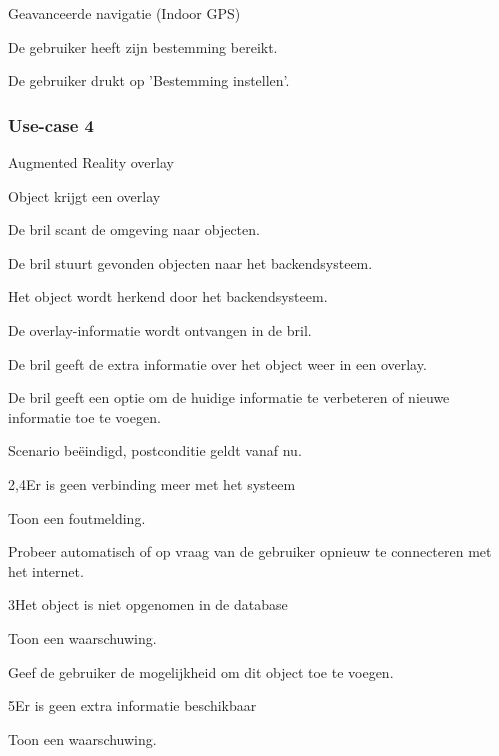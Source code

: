 \documentclass[12pt,a4paper,oneside]{article}
\begin{document}
\begin{uc}{Geavanceerde navigatie (Indoor GPS)}
    \begin{uc-post}
    \item De gebruiker heeft zijn bestemming bereikt.
    \end{uc-post}

    \begin{uc-trig}
    \item De gebruiker drukt op 'Bestemming instellen'.
    \end{uc-trig}

\end{uc}
\setcounter{section}{4}
\subsubsection{Use-case 4}
\begin{uc}{Augmented Reality overlay}

    \begin{uc-mss}{Object krijgt een overlay}
	\item De bril scant de omgeving naar objecten.
	\item De bril stuurt gevonden objecten naar het backendsysteem.
	\item Het object wordt herkend door het backendsysteem.
	\item De overlay-informatie wordt ontvangen in de bril.
	\item De bril geeft de extra informatie over het object weer in een overlay.
	\item De bril geeft een optie om de huidige informatie te verbeteren of nieuwe informatie toe te voegen.
	\item Scenario be\"eindigd, postconditie geldt vanaf nu.
    \end{uc-mss}

    \begin{uc-ext}

		\begin{uc-fail}{2,4}{Er is geen verbinding meer met het systeem}
		\item Toon een foutmelding.
		\item Probeer automatisch of op vraag van de gebruiker opnieuw te connecteren met het internet.
		\end{uc-fail}		
		\begin{uc-fail}{3}{Het object is niet opgenomen in de database}
		\item Toon een waarschuwing.
		\item Geef de gebruiker de mogelijkheid om dit object toe te voegen.
		\end{uc-fail}		
		\begin{uc-fail}{5}{Er is geen extra informatie beschikbaar}
		\item Toon een waarschuwing.
		\end{uc-fail}


\end{uc-ext}
\end{uc}
\end{document}
